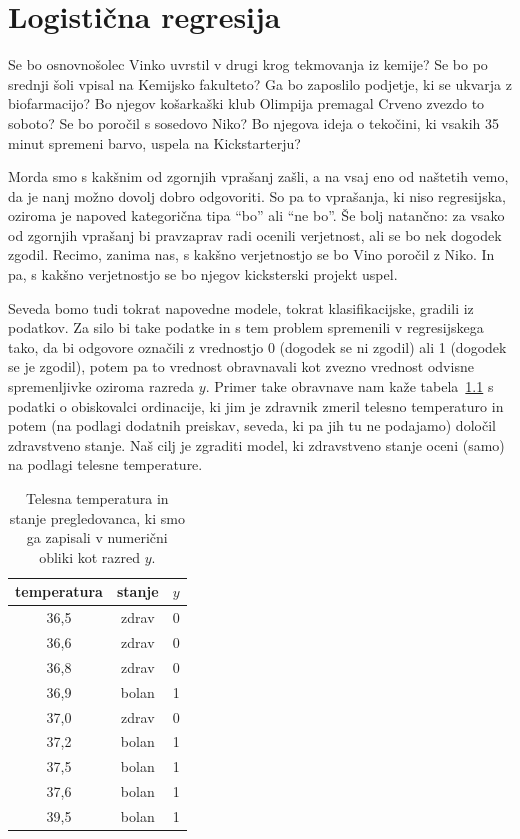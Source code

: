 \chapter{Logistična regresija}

Se bo osnovnošolec Vinko uvrstil v drugi krog tekmovanja iz kemije? Se bo po srednji šoli vpisal na Kemijsko fakulteto? Ga bo zaposlilo podjetje, ki se ukvarja z biofarmacijo? Bo njegov košarkaški klub Olimpija premagal Crveno zvezdo to soboto? Se bo poročil s sosedovo Niko? Bo njegova ideja o tekočini, ki vsakih 35 minut spremeni barvo, uspela na Kickstarterju?

Morda smo s kakšnim od zgornjih vprašanj zašli, a na vsaj eno od naštetih vemo, da je nanj možno dovolj dobro odgovoriti. So pa to vprašanja, ki niso regresijska, oziroma je napoved kategorična tipa ``bo'' ali ``ne bo''. Še bolj natančno: za vsako od zgornjih vprašanj bi pravzaprav radi ocenili verjetnost, ali se bo nek dogodek zgodil. Recimo, zanima nas, s kakšno verjetnostjo se bo Vino poročil z Niko. In pa, s kakšno verjetnostjo se bo njegov kicksterski projekt uspel.

Seveda bomo tudi tokrat napovedne modele, tokrat klasifikacijske, gradili iz podatkov. Za silo bi take podatke in s tem problem spremenili v regresijskega tako, da bi odgovore označili z vrednostjo 0 (dogodek se ni zgodil) ali 1 (dogodek se je zgodil), potem pa to vrednost obravnavali kot zvezno vrednost odvisne spremenljivke oziroma razreda $y$. Primer take obravnave nam kaže tabela~\ref{f:temperatura} s podatki o obiskovalci ordinacije, ki jim je zdravnik zmeril telesno temperaturo in potem (na podlagi dodatnih preiskav, seveda, ki pa jih tu ne podajamo) določil zdravstveno stanje. Naš cilj je zgraditi model, ki zdravstveno stanje oceni (samo) na podlagi telesne temperature.

\begin{table}[htbp]
\caption{Telesna temperatura in stanje pregledovanca, ki smo ga zapisali v numerični obliki kot razred $y$.}
\label{f:temperatura}
\begin{center}
\begin{tabular}{ccc}
\toprule
temperatura & stanje & $y$ \\
\midrule
36,5 & zdrav & 0 \\
36,6 & zdrav & 0 \\
36,8 & zdrav & 0 \\
36,9 & bolan & 1 \\
37,0 & zdrav & 0 \\
37,2 & bolan & 1 \\
37,5 & bolan & 1 \\
37,6 & bolan & 1 \\
39,5 & bolan & 1 \\
\bottomrule
\end{tabular}
\end{center}
\end{table}


